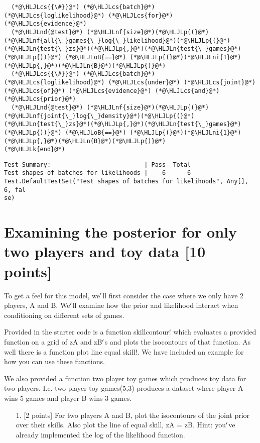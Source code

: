 \documentclass[12pt,a4paper]{article}
\newcommand{\HLJLk}[1]{\textcolor[RGB]{148,91,176}{\textbf{#1}}}
\newcommand{\HLJLn}[1]{#1}
\newcommand{\HLJLnd}[1]{\textcolor[RGB]{214,102,97}{#1}}
\newcommand{\HLJLnf}[1]{\textcolor[RGB]{66,102,213}{#1}}
\newcommand{\HLJLni}[1]{\textcolor[RGB]{59,151,46}{#1}}
\newcommand{\HLJLoB}[1]{\textcolor[RGB]{102,102,102}{\textbf{#1}}}
\newcommand{\HLJLp}[1]{#1}
\newcommand{\HLJLcs}[1]{\textcolor[RGB]{153,153,119}{\textit{#1}}}
\begin{document}
\begin{lstlisting}
  (*@\HLJLcs{{\#}}@*) (*@\HLJLcs{batch}@*) (*@\HLJLcs{loglikelihood}@*) (*@\HLJLcs{for}@*) (*@\HLJLcs{evidence}@*)
  (*@\HLJLnd{@test}@*) (*@\HLJLnf{size}@*)(*@\HLJLp{(}@*)(*@\HLJLnf{all{\_}games{\_}log{\_}likelihood}@*)(*@\HLJLp{(}@*)(*@\HLJLn{test{\_}zs}@*)(*@\HLJLp{,}@*)(*@\HLJLn{test{\_}games}@*)(*@\HLJLp{))}@*) (*@\HLJLoB{==}@*) (*@\HLJLp{(}@*)(*@\HLJLni{1}@*)(*@\HLJLp{,}@*)(*@\HLJLn{B}@*)(*@\HLJLp{)}@*)
  (*@\HLJLcs{{\#}}@*) (*@\HLJLcs{batch}@*) (*@\HLJLcs{loglikelihood}@*) (*@\HLJLcs{under}@*) (*@\HLJLcs{joint}@*) (*@\HLJLcs{of}@*) (*@\HLJLcs{evidence}@*) (*@\HLJLcs{and}@*) (*@\HLJLcs{prior}@*)
  (*@\HLJLnd{@test}@*) (*@\HLJLnf{size}@*)(*@\HLJLp{(}@*)(*@\HLJLnf{joint{\_}log{\_}density}@*)(*@\HLJLp{(}@*)(*@\HLJLn{test{\_}zs}@*)(*@\HLJLp{,}@*)(*@\HLJLn{test{\_}games}@*)(*@\HLJLp{))}@*) (*@\HLJLoB{==}@*) (*@\HLJLp{(}@*)(*@\HLJLni{1}@*)(*@\HLJLp{,}@*)(*@\HLJLn{B}@*)(*@\HLJLp{)}@*)
(*@\HLJLk{end}@*)
\end{lstlisting}

\begin{lstlisting}
Test Summary:                          | Pass  Total
Test shapes of batches for likelihoods |    6      6
Test.DefaultTestSet("Test shapes of batches for likelihoods", Any[], 6, fal
se)
\end{lstlisting}


\section{Examining the posterior for only two players and toy data [10 points]}
To get a feel for this model, we\ensuremath{\rq}ll first consider the case where we only have 2 players, A and B. We\ensuremath{\rq}ll examine how the prior and likelihood interact when conditioning on different sets of games.

Provided in the starter code is a function skillcontour! which evaluates a provided function on a grid of zA and zB\ensuremath{\rq}s and plots the isocontours of that function. As well there is a function plot line equal skill!. We have included an example for how you can use these functions.

We also provided a function two player toy games which produces toy data for two players. I.e. two player toy games(5,3) produces a dataset where player A wins 5 games and player B wins 3 games.

\begin{itemize}
\item[1. ] [2 points] For two players A and B, plot the isocontours of the joint prior over their skills. Also plot the line of equal skill, zA = zB. Hint: you\ensuremath{\rq}ve already implemented the log of the likelihood function.

\end{itemize}
\end{document}
